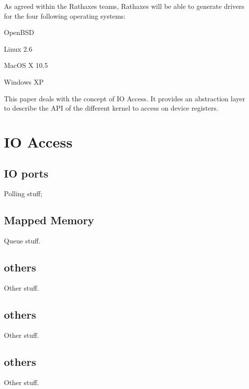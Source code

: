 \documentclass[11pt]{report}
\begin{document}
As agreed within the Rathaxes teams, Rathaxes will be able to generate drivers
for the four following operating systems:
\begin{description}
    \item{OpenBSD}
    \item{Linux 2.6}
    \item{MacOS X 10.5}
    \item{Windows XP}
\end{description}

This paper deals with the concept of IO Access. It provides
an abstraction layer to describe the API of the different kernel
to access on device registers.


\tableofcontents

\chapter{IO Access}

\section{IO ports}
Polling stuff;

\section{Mapped Memory}
Queue stuff.

\section{others}
Other stuff.

\section{others}
Other stuff.

\section{others}
Other stuff.
\end{document}
